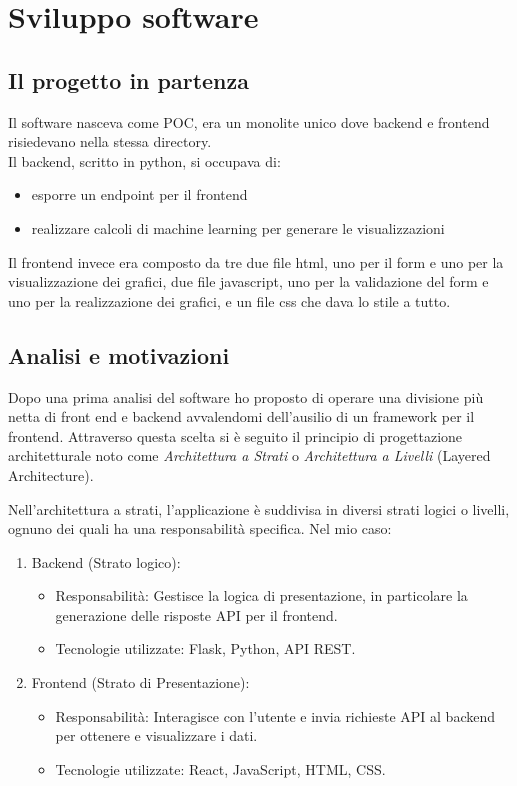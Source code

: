 \chapter{Sviluppo software}
\label{cap:sviluppo software}


\section{Il progetto in partenza}
Il software nasceva come POC, era un monolite unico dove backend e frontend risiedevano nella stessa directory.\\
Il backend, scritto in python, si occupava di:
\begin{itemize}
    \item esporre un endpoint per il frontend 
    \item realizzare calcoli di machine learning per generare le visualizzazioni 
\end{itemize}

Il frontend invece era composto da tre due file html, uno per il form e uno per la visualizzazione dei grafici, due file javascript, uno per la validazione del form e uno per la realizzazione dei grafici, e un file css che dava lo stile a tutto. 

\section{Analisi e motivazioni}

Dopo una prima analisi del software ho proposto di operare una divisione più netta di front end e backend avvalendomi dell'ausilio di un framework per il frontend. Attraverso questa scelta si è seguito il principio di progettazione architetturale noto come \textit{Architettura a Strati} o \textit{Architettura a Livelli} (Layered Architecture).

Nell'architettura a strati, l'applicazione è suddivisa in diversi strati logici o livelli, ognuno dei quali ha una responsabilità specifica. Nel mio caso:
\begin{enumerate}
\item Backend (Strato logico):
    \begin{itemize}
        \item  Responsabilità: Gestisce la logica di presentazione, in particolare la generazione delle risposte API per il frontend.
        \item  Tecnologie utilizzate: Flask, Python, API REST.
    \end{itemize}
\item Frontend (Strato di Presentazione):
 \begin{itemize}
    \item Responsabilità: Interagisce con l'utente e invia richieste API al backend per ottenere e visualizzare i dati.
    \item Tecnologie utilizzate: React, JavaScript, HTML, CSS.
    \end{itemize}
\end{enumerate}


